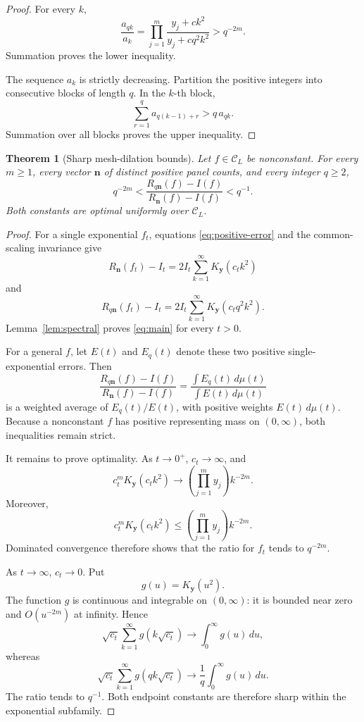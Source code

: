 \documentclass[11pt]{article}
\newtheorem{theorem}{Theorem}[section]
\theoremstyle{definition}
\theoremstyle{remark}
\newcommand{\cC}{\mathcal{C}}
\newcommand{\bN}{\boldsymbol{n}}
\newcommand{\bY}{\boldsymbol{y}}
\newcommand{\1}{\mathbf{1}}
\begin{document}
\begin{proof}
For every \(k\),
\[
\frac{a_{qk}}{a_k}
=
\prod_{j=1}^{m}
\frac{y_j+ck^2}{y_j+cq^2k^2}
>q^{-2m}.
\]
Summation proves the lower inequality.

The sequence \(a_k\) is strictly decreasing. Partition the positive integers
into consecutive blocks of length \(q\). In the \(k\)-th block,
\[
\sum_{r=1}^{q}a_{q(k-1)+r}>q\,a_{qk}.
\]
Summation over all blocks proves the upper inequality.
\end{proof}

\begin{theorem}[Sharp mesh-dilation bounds]
\label{thm:main}
Let \(f\in\cC_L\) be nonconstant. For every \(m\ge1\), every vector
\(\bN\) of distinct positive panel counts, and every integer \(q\ge2\),
\begin{equation}
\boxed{
q^{-2m}
<
\frac{R_{q\bN}(f)-I(f)}
     {R_{\bN}(f)-I(f)}
<
q^{-1}.}
\label{eq:main}
\end{equation}
Both constants are optimal uniformly over \(\cC_L\).
\end{theorem}

\begin{proof}
For a single exponential \(f_t\), equations
\eqref{eq:positive-error} and the common-scaling invariance give
\[
R_{\bN}(f_t)-I_t
=2I_t\sum_{k=1}^{\infty}K_{\bY}(c_tk^2)
\]
and
\[
R_{q\bN}(f_t)-I_t
=2I_t\sum_{k=1}^{\infty}K_{\bY}(c_tq^2k^2).
\]
Lemma~\ref{lem:spectral} proves \eqref{eq:main} for every \(t>0\).

For a general \(f\), let \(E(t)\) and \(E_q(t)\) denote these two positive
single-exponential errors. Then
\[
\frac{R_{q\bN}(f)-I(f)}{R_{\bN}(f)-I(f)}
=
\frac{\int E_q(t)\,d\mu(t)}{\int E(t)\,d\mu(t)}
\]
is a weighted average of \(E_q(t)/E(t)\), with positive weights
\(E(t)\,d\mu(t)\). Because a nonconstant \(f\) has positive representing mass
on \((0,\infty)\), both inequalities remain strict.

It remains to prove optimality. As \(t\to0^+\), \(c_t\to\infty\), and
\[
c_t^mK_{\bY}(c_tk^2)
\longrightarrow
\left(\prod_{j=1}^{m}y_j\right)k^{-2m}.
\]
Moreover,
\[
c_t^mK_{\bY}(c_tk^2)
\le
\left(\prod_{j=1}^{m}y_j\right)k^{-2m}.
\]
Dominated convergence therefore shows that the ratio for \(f_t\) tends to
\(q^{-2m}\).

As \(t\to\infty\), \(c_t\to0\). Put
\[
g(u)=K_{\bY}(u^2).
\]
The function \(g\) is continuous and integrable on \((0,\infty)\): it is
bounded near zero and \(O(u^{-2m})\) at infinity. Hence
\[
\sqrt{c_t}\sum_{k=1}^{\infty}g(k\sqrt{c_t})
\longrightarrow
\int_0^\infty g(u)\,du,
\]
whereas
\[
\sqrt{c_t}\sum_{k=1}^{\infty}g(qk\sqrt{c_t})
\longrightarrow
\frac1q\int_0^\infty g(u)\,du.
\]
The ratio tends to \(q^{-1}\). Both endpoint constants are therefore sharp
within the exponential subfamily.
\end{proof}
\end{document}
